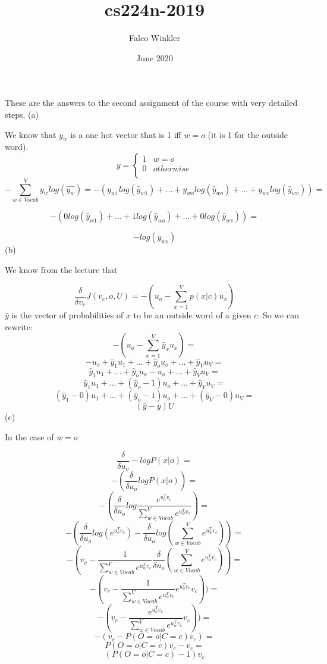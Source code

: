\documentclass{article}
\title{cs224n-2019}
\author{Falco Winkler}
\date{June 2020}
\begin{document}
\maketitle

These are the answers to the second assignment of the course with very detailed steps.
\newline\newline
(a)

We know that $y_w$ is a one hot vector that is 1 iff $w = o$ (it is 1 for the outside word).
$$y = \left\{
\begin{array}{ll}
1 & w = o \\
0 & otherwise \\
\end{array}
\right. $$
$$- \sum^{V}_{w\in Vocab} y_w log(\hat{y_w}) = - (y_{w1} log(\hat{y}_{w1}) + ... + y_{wo} log(\hat{y}_{wo}) + ... + y_{wv} log(\hat{y}_{wv})) = $$

$$- (0 log(\hat{y}_{w1}) + ... + 1 log(\hat{y}_{wo}) + ... + 0 log(\hat{y}_{wv})) = $$

$$-log(\hat{y}_{wo})$$
\newline
(b)

We know from the lecture that

$$\frac{\delta}{\delta v_c} J(v_c, o, U) = - (u_o - \sum^V_{x=1}p(x|c)u_x)$$
$\hat{y}$ is the vector of probabilities of $x$ to be an outside word of a given $c$. So we can rewrite:
$$ - (u_o - \sum^V_{x=1}\hat{y}_x u_x) = $$
$$-u_o + \hat{y}_1 u_1 + ... + \hat{y}_o u_o + ... + \hat{y}_V u_V = $$
$$\hat{y}_1 u_1 + ... + \hat{y}_o u_o - u_o + ... + \hat{y}_V u_V =$$
$$\hat{y}_1 u_1 + ... + (\hat{y}_o - 1) u_o + ... + \hat{y}_V u_V =$$
$$(\hat{y}_1 - 0) u_1 + ... + (\hat{y}_o - 1) u_o + ... + (\hat{y}_V - 0) u_V =$$
$$(\hat{y} - y)U$$
\newline
(c)

In the case of $w = o$

$$\frac{\delta}{\delta u_o} - log P(x|o) = $$
$$-(\frac{\delta}{\delta u_o}log P(x|o)) =$$
$$-(\frac{\delta}{\delta u_o}log \frac{e^{u_o^Tv_c}}{\sum_{w\in Vocab}^{V}e^{u_w^Tv_c}}) =$$
$$-(\frac{\delta}{\delta u_o}log (e^{u_o^Tv_c}) - \frac{\delta}{\delta u_o}log(\sum_{w\in Vocab}^{V}e^{u_w^Tv_c})) =$$
$$-(v_c - \frac{1}{\sum_{w\in Vocab}^{V}e^{u_w^Tv_c}}\frac{\delta}{\delta u_o}(\sum_{w\in Vocab}^{V}e^{u_w^Tv_c})) =$$
$$-(v_c - \frac{1}{\sum_{w\in Vocab}^{V}e^{u_w^Tv_c}} e^{u_o^Tv_c}v_c)) =$$
$$-(v_c - \frac{e^{u_o^Tv_c}}{\sum_{w\in Vocab}^{V}e^{u_w^Tv_c}}v_c)) =$$
$$-(v_c - P(O = o|C = c)v_c) =$$
$$P(O = o|C = c)v_c - v_c =$$
$$(P(O = o|C = c) - 1)v_c$$
\end{document}
